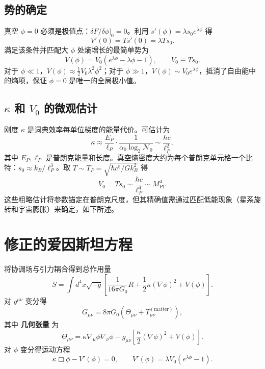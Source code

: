 \documentclass[12pt,a4paper]{article}
\begin{document}
	\subsection{势的确定}
	真空 \(\phi=0\) 必须是极值点：\(\delta F/\delta\phi|_0 = 0\)。利用 \(s'(\phi) = \lambda s_0 e^{\lambda\phi}\) 得
	\[
	V'(0) = T s'(0) = \lambda T s_0.
	\]
	满足该条件并匹配大 \(\phi\) 处熵增长的最简单势为
	\begin{equation}
		\boxed{V(\phi) = V_0 \left( e^{\lambda\phi} - \lambda\phi - 1 \right), \qquad V_0 \equiv T s_0.}
		\label{eq:V}
	\end{equation}
	对于 \(\phi \ll 1\)，\(V(\phi) \approx \frac12 V_0 \lambda^2 \phi^2\)；对于 \(\phi \gg 1\)，\(V(\phi) \sim V_0 e^{\lambda\phi}\)，抵消了自由能中的熵项，保证 \(\phi=0\) 是唯一的全局极小值。
	
	\subsection{\(\kappa\) 和 \(V_0\) 的微观估计}
	刚度 \(\kappa\) 是词典效率每单位梯度的能量代价。可估计为
	\[
	\kappa \approx \frac{E_P}{\ell_P} \cdot \frac{1}{\alpha_0 \log_2 \mathcal{N}_0} \sim \frac{\hbar c}{\ell_P^2},
	\]
	其中 \(E_P, \ell_P\) 是普朗克能量和长度。真空熵密度大约为每个普朗克单元格一个比特：\(s_0 \approx k_B / \ell_P^3\)。取 \(T \sim T_P = \sqrt{\hbar c^5 / G k_B^2}\) 得
	\[
	V_0 = T s_0 \sim \frac{\hbar c}{\ell_P^4} \sim M_{\mathrm{Pl}}^4.
	\]
	这些粗略估计将参数锚定在普朗克尺度，但其精确值需通过匹配低能现象（星系旋转和宇宙膨胀）来确定，如下所述。
	
	\section{修正的爱因斯坦方程}
	
	将协调场与引力耦合得到总作用量
	\begin{equation}
		S = \int d^4x \sqrt{-g} \left[ \frac{1}{16\pi G_0} R + \frac{1}{2}\kappa (\nabla\phi)^2 + V(\phi) \right].
		\label{eq:action}
	\end{equation}
	对 \(g^{\mu\nu}\) 变分得
	\begin{equation}
		G_{\mu\nu} = 8\pi G_0 \left( \Theta_{\mu\nu} + T_{\mu\nu}^{(\mathrm{matter})} \right),
		\label{eq:einstein}
	\end{equation}
	其中 \textbf{几何张量} 为
	\begin{equation}
		\Theta_{\mu\nu} = \kappa \nabla_\mu \phi \nabla_\nu \phi - g_{\mu\nu} \left[ \frac{\kappa}{2} (\nabla\phi)^2 + V(\phi) \right].
		\label{eq:Theta}
	\end{equation}
	对 \(\phi\) 变分得运动方程
	\begin{equation}
		\kappa \Box \phi - V'(\phi) = 0, \qquad V'(\phi) = \lambda V_0 \left( e^{\lambda\phi} - 1 \right).
		\label{eq:phieom}
	\end{equation}
	
\end{document}
